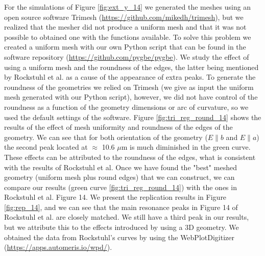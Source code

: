 For the simulations of Figure \ref{fig:ext_y_14} we generated the meshes using an open source software Trimesh (\url{https://github.com/mikedh/trimesh}), 
but we realized that the mesher did not produce a uniform mesh and that it was not possible to obtained one with the functions available. To solve this problem 
we created a uniform mesh with our own Python script that can be found in the software repository (\url{https://github.com/pygbe/pygbe}). We study the 
effect of using a uniform mesh and the roundness of the edges, the latter being mentioned by Rockstuhl et al. as a cause of the appearance of extra peaks. To 
generate the roundness of the geometries we relied on Trimesh (we give as input the uniform mesh generated with our Python script), however, we did not have 
control of the roundness as a function of the geometry dimensions or arc of curvature, so we used the default settings of
the software. Figure \ref{fig:tri_reg_round_14} shows the results of the effect of mesh uniformity and roundness of the edges of the geometry. We can see 
that for both orientation of the geometry ($E\parallel b$ and $E\parallel a$) the second peak located at $\approx$ 10.6 $\mu$m is much diminished in the
green curve. These effects can be attributed to the roundness of the edges, what is consistent with the results of Rockstuhl et al. Once we have found the
"best" meshed geometry (uniform mesh plus round edges) that we can construct, we can compare our results (green curve \ref{fig:tri_reg_round_14}) with the ones
in Rockstuhl et al. Figure 14. We present the replication results in Figure \ref{fig:rep_14}, and we can see that the main resonance peaks in Figure 14 of 
Rockstuhl et al. are closely matched. We still have a third peak in our results, but we attribute this to the effects introduced by using a 3D geometry. We 
obtained the data from Rockstuhl's curves by using the WebPlotDigitizer (\url{https://apps.automeris.io/wpd/}).
 

